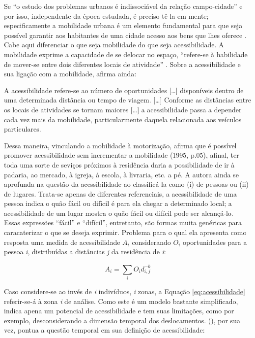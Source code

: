Se ``o estudo dos problemas urbanos é indissociável da relação campo-cidade'' \cite[p.154]{FREITAG2007} e por isso, independente da época estudada, é preciso tê-la em mente; especificamente a mobilidade urbana é um elemento fundamental para que seja possível garantir aos habitantes de uma cidade acesso aos bens que lhes oferece \cite{IEMA2010}. Cabe aqui diferenciar o que seja mobilidade do que seja acessibilidade. A mobilidade exprime a capacidade de se delocar no espaço, ``refere-se à habilidade de mover-se entre dois diferentes locais de atividade'' \cite[p.04]{HANSON1995a}.
Sobre a acessibilidade e sua ligação com a mobilidade,  afirma ainda:

\begin{citacao}
A acessibilidade refere-se ao número de oportunidades [\ldots] disponíveis dentro de uma determinada distância ou tempo de viagem. [\ldots] Conforme as distâncias entre os locais de atividades se tornam maiores [\ldots] a acessibilidade passa a depender cada vez mais da mobilidade, particularmente daquela relacionada aos veículos particulares. \cite[p.04]{HANSON1995a}
\end{citacao}

Dessa maneira, vinculando a mobilidade à motorização,  afirma que é possível promover acessibilidade sem incrementar a mobilidade (1995, p.05), afinal, ter toda uma sorte de seviços próximos à residência daria a possibilidade de ir à padaria, ao mercado, à igreja, à escola, à livraria, etc. a pé. A autora ainda se aprofunda na questão da acessibilidade ao classificá-la como (i) de pessoas ou (ii) de lugares. Trata-se apenas de diferentes referenciais, a acessibilidade de uma pessoa indica o quão fácil ou difícil é para ela chegar a determinado local; a acessibilidade de um lugar mostra o quão fácil ou difícil pode ser alcançá-lo. Essas expressões ``fácil'' e ``difícil'', entretanto, são formas muita genéricas para caracaterizar o que se deseja exprimir. Problema para o qual ela apresenta como resposta uma medida de acessibilidade $A_{i}$ considerando $O_{i}$ oportunidades para a pessoa \emph{i}, distribuídas a distâncias \emph{j} da residência de \emph{i}:

\begin{equation}\label{eq:acessibilidade}
A_{i} = \sum_{i}^{} O_{i} d_{i,j}^ {-b}
\end{equation}

Caso considere-se ao invés de \emph{i} indivíduos, \emph{i} zonas, a Equação \ref{eq:acessibilidade} referir-se-á à zona \emph{i} de análise. Como este é um modelo bastante simplificado, indica apena um potencial de acessibilidade e tem suas limitações, como por exemplo, desconsiderando a dimensão temporal dos deslocamentos.
 (\citeyear{VASCONCELLOS2012}), por sua vez, pontua a questão temporal em sua definição de acessibilidade:

